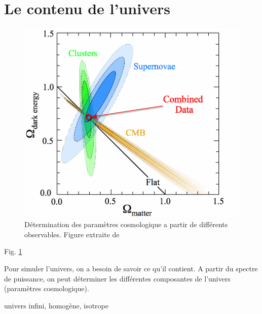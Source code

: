 \section{Le contenu de l'univers}
\label{cosmoparam}

\begin{figure}[bth]
        \includegraphics[width=.95\linewidth]{img/01/cosmoparam.png} 
        \caption{Détermination des paramètres cosmologique a partir de différents observables. Figure extraite de \cite{2008ApJ...686..749K}}
 		\label{fig:cosmoparam}
\end{figure}

Fig. \ref{fig:cosmoparam}


Pour simuler l'univers, on a besoin de savoir ce qu'il contient. 
A partir du spectre de puissance, on peut déterminer les différentes composantes de l'univers (paramètres cosmologique).

univers infini, homogène, isotrope




